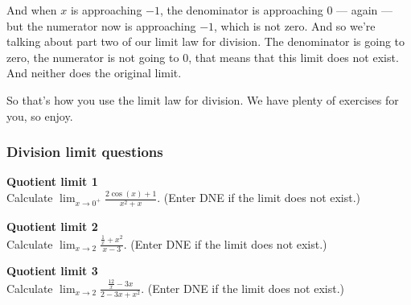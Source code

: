 \documentclass[pdftex, brazil, 12pt, twoside]{article}
\begin{document}
And when $x$ is approaching $-1$,
the denominator is approaching $0$ --- again ---
but the numerator now is approaching $-1$,
which is not zero.
And so we're talking about part two of our limit law
for division.
The denominator is going to zero,
the numerator is not going to $0$, that means
that this limit does not exist.
And neither does the original limit.

\begin{figure}[H]
  \begin{center}
  \end{center}
\end{figure}

So that's how you use the limit law for division.
We have plenty of exercises for you, so enjoy.

\subsubsection{Division limit questions}
\label{u0-lim-quo-questions}

\begin{exercise}
  \textbf{Quotient limit 1}\\
  Calculate $\displaystyle \lim_{x \to 0^+}\frac{2\cos{(x)}+1}{x^2 + x}$. (Enter DNE
  if the limit does not exist.)
\end{exercise}

\begin{exercise}
  \textbf{Quotient limit 2}\\
  Calculate $\displaystyle \lim_{x \to 2}\frac{\frac{1}{x}+x^2}{x-3}$. (Enter DNE
  if the limit does not exist.)
\end{exercise}

\begin{exercise}
  \textbf{Quotient limit 3}\\
  Calculate $\displaystyle \lim_{x \to 2}\frac{\frac{12}{x}-3x}{2-3x+x^2}$. (Enter DNE
  if the limit does not exist.)
\end{exercise}
\end{document}
